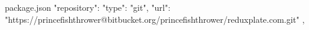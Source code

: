 {package.json}
"repository": {
  "type": "git",
  "url": "https://princefishthrower@bitbucket.org/princefishthrower/reduxplate.com.git"
},
